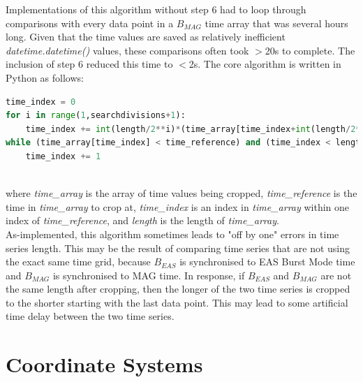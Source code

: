 Implementations of this algorithm without step 6 had to loop through comparisons with every data point in a \(B_{MAG}\) time array that was several hours long. Given that the time values are saved as relatively inefficient \textit{datetime.datetime()} values, these comparisons often took \(>\)20s to complete. The inclusion of step 6 reduced this time to \(<\)2s. The core algorithm is written in Python as follows:
\\

\lstset{basicstyle=\tiny, style=myCustomMatlabStyle}
\begin{lstlisting}[language=Python]
time_index = 0
for i in range(1,searchdivisions+1):
    time_index += int(length/2**i)*(time_array[time_index+int(length/2**i)] < time_reference)
while (time_array[time_index] < time_reference) and (time_index < length-1):
    time_index += 1
\end{lstlisting}
\\

where \textit{time\_array} is the array of time values being cropped, \textit{time\_reference} is the time in \textit{time\_array} to crop at, \textit{time\_index} is an index in \textit{time\_array} within one index of \textit{time\_reference}, and \textit{length} is the length of \textit{time\_array}.
\\

As-implemented, this algorithm sometimes leads to "off by one" errors in time series length. This may be the result of comparing time series that are not using the exact same time grid, because \(B_{EAS}\) is synchronised to EAS Burst Mode time and \(B_{MAG}\) is synchronised to MAG time. In response, if \(B_{EAS}\) and \(B_{MAG}\) are not the same length after cropping, then the longer of the two time series is cropped to the shorter starting with the last data point. This may lead to some artificial time delay between the two time series.

\section{Coordinate Systems} \label{coordinate systems}

